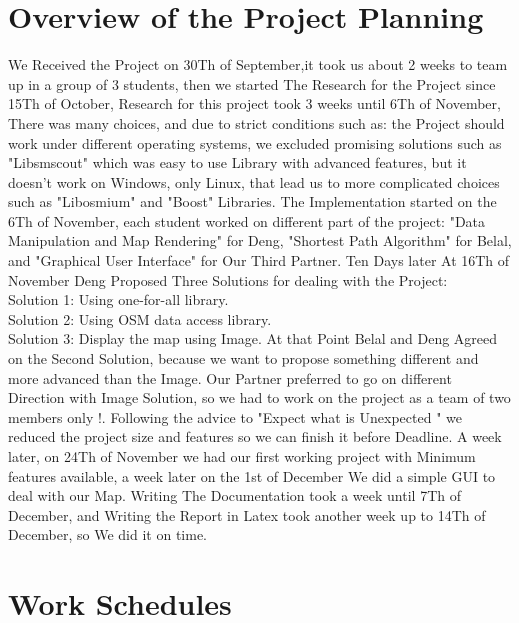 \documentclass[a4paper, 12pt, english]{book}
\begin{document}
\section{Overview of the Project Planning}
We Received the Project on 30Th of September,it took us about 2 weeks to 
team up in a group of 3 students, then we started The Research for the 
Project since 15Th of October, Research for this project took 3 weeks 
until 6Th of November, There was many choices, and due to strict conditions such as: the Project should work under different operating systems, we excluded promising solutions such as "Libsmscout" which was easy to use Library with advanced features, but it doesn't work on Windows, only Linux, that lead us to more complicated choices such as "Libosmium" and "Boost" Libraries.
The Implementation started on the 6Th of November, each student worked on different part of the project: "Data Manipulation and Map Rendering" for Deng, "Shortest Path Algorithm" for Belal, and "Graphical User Interface" for Our Third Partner.
Ten Days later At 16Th of November Deng Proposed Three Solutions for dealing with the Project:
\\ \textbf{}Solution 1: Using one-for-all library.
\\ \textbf{}Solution 2: Using OSM data access library.
\\ \textbf{}Solution 3: Display the map using Image.
At that Point Belal and Deng Agreed on the Second Solution, because we want to propose something different and more advanced than the Image.
Our Partner preferred to go on different Direction with Image Solution, so we had to work on the project as a team of two members only !.
Following the advice to "Expect what is Unexpected " we reduced the project size and features so we can finish it before Deadline.
A week later, on 24Th of November we had our first working project with Minimum features available, a week later on the 1st of December We did a simple GUI to deal with our Map.
Writing The Documentation took a week until 7Th of December, and Writing the Report in Latex took another week up to 14Th of December, so We did it on time.




\section{Work Schedules}
\end{document}
